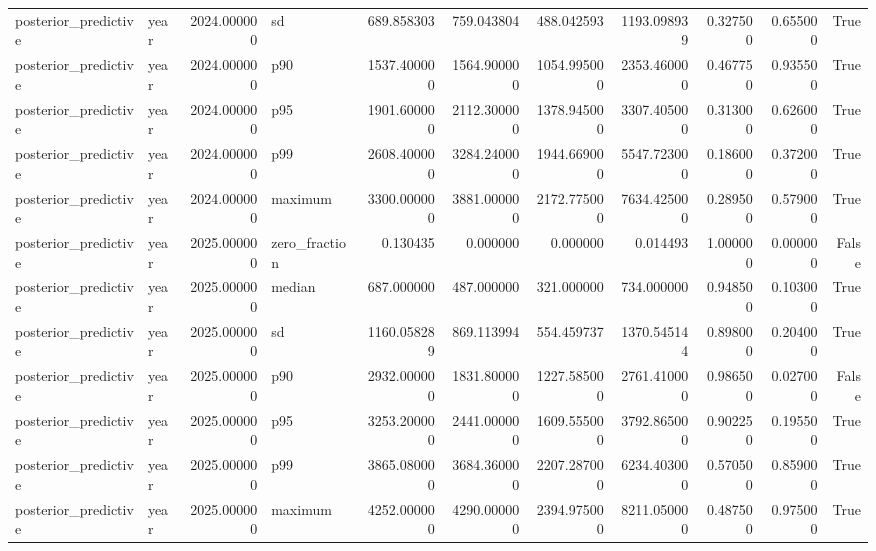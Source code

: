\begin{tabular}{llrlrrrrrrr}
posterior\_predictive & year & 2024.000000 & sd & 689.858303 & 759.043804 & 488.042593 & 1193.098939 & 0.327500 & 0.655000 & True \\
posterior\_predictive & year & 2024.000000 & p90 & 1537.400000 & 1564.900000 & 1054.995000 & 2353.460000 & 0.467750 & 0.935500 & True \\
posterior\_predictive & year & 2024.000000 & p95 & 1901.600000 & 2112.300000 & 1378.945000 & 3307.405000 & 0.313000 & 0.626000 & True \\
posterior\_predictive & year & 2024.000000 & p99 & 2608.400000 & 3284.240000 & 1944.669000 & 5547.723000 & 0.186000 & 0.372000 & True \\
posterior\_predictive & year & 2024.000000 & maximum & 3300.000000 & 3881.000000 & 2172.775000 & 7634.425000 & 0.289500 & 0.579000 & True \\
posterior\_predictive & year & 2025.000000 & zero\_fraction & 0.130435 & 0.000000 & 0.000000 & 0.014493 & 1.000000 & 0.000000 & False \\
posterior\_predictive & year & 2025.000000 & median & 687.000000 & 487.000000 & 321.000000 & 734.000000 & 0.948500 & 0.103000 & True \\
posterior\_predictive & year & 2025.000000 & sd & 1160.058289 & 869.113994 & 554.459737 & 1370.545144 & 0.898000 & 0.204000 & True \\
posterior\_predictive & year & 2025.000000 & p90 & 2932.000000 & 1831.800000 & 1227.585000 & 2761.410000 & 0.986500 & 0.027000 & False \\
posterior\_predictive & year & 2025.000000 & p95 & 3253.200000 & 2441.000000 & 1609.555000 & 3792.865000 & 0.902250 & 0.195500 & True \\
posterior\_predictive & year & 2025.000000 & p99 & 3865.080000 & 3684.360000 & 2207.287000 & 6234.403000 & 0.570500 & 0.859000 & True \\
posterior\_predictive & year & 2025.000000 & maximum & 4252.000000 & 4290.000000 & 2394.975000 & 8211.050000 & 0.487500 & 0.975000 & True \\
\bottomrule
\end{tabular}
